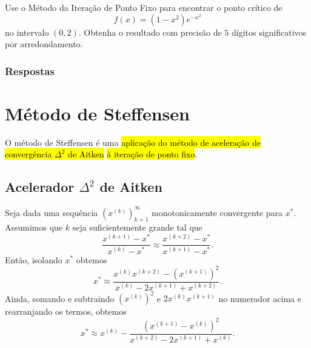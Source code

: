 \begin{exer}
  Use o Método da Iteração de Ponto Fixo para encontrar o ponto crítico de
  \begin{equation}
    f(x) = (1-x^2)e^{-x^2}
  \end{equation}
  no intervalo $(0, 2)$. Obtenha o resultado com precisão de $5$ dígitos significativos por arredondamento.
\end{exer}

\ifisbook
\subsubsection{Respostas}
\shipoutAnswer
\fi


\section{Método de Steffensen}\label{cap_eq1d_sec_Steffensen}

O método de Steffensen é uma \hl{aplicação do método de aceleração de convergência $\Delta^2$ de Aitken} \hl{à iteração de ponto fixo}.

\subsection{Acelerador $\Delta^2$ de Aitken}

Seja dada uma sequência $(x^{(k)})_{k=1}^\infty$ monotonicamente convergente para $x^*$. Assumimos que $k$ seja suficientemente grande tal que
\begin{equation}
  \frac{x^{(k+1)}-x^*}{x^{(k)}-x^*} \approx \frac{x^{(k+2)}-x^*}{x^{(k+1)}-x^*}.
\end{equation}
Então, isolando $x^*$ obtemos
\begin{equation}
  x^* \approx \frac{x^{(k)}x^{(k+2)}-(x^{(k+1)})^2}{x^{(k)}-2x^{(k+1)}+x^{(k+2)}}.
\end{equation}
Ainda, somando e subtraindo $(x^{(k)})^2$ e $2x^{(k)}x^{(k+1)}$ no numerador acima e rearranjando os termos, obtemos
\begin{equation}
  x^* \approx x^{(k)} - \frac{(x^{(k+1)}-x^{(k)})^2}{x^{(k+2)}-2x^{(k+1)}+x^{(k)}}.
\end{equation}

